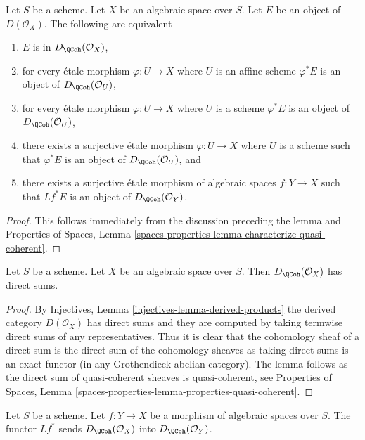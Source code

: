 \begin{lemma}
\label{lemma-check-quasi-coherence-on-covering}
Let $S$ be a scheme. Let $X$ be an algebraic space over $S$.
Let $E$ be an object of $D(\mathcal{O}_X)$. The following are equivalent
\begin{enumerate}
\item $E$ is in $D_\QCoh(\mathcal{O}_X)$,
\item for every \'etale morphism $\varphi : U \to X$ where $U$ is an
affine scheme $\varphi^*E$ is an object of
$D_\QCoh(\mathcal{O}_U)$,
\item for every \'etale morphism $\varphi : U \to X$ where $U$ is a scheme
$\varphi^*E$ is an object of
$D_\QCoh(\mathcal{O}_U)$,
\item there exists a surjective \'etale morphism $\varphi : U \to X$
where $U$ is a scheme such that $\varphi^*E$ is an object of
$D_\QCoh(\mathcal{O}_U)$, and
\item there exists a surjective \'etale morphism of algebraic spaces
$f : Y \to X$ such that $Lf^*E$ is an object of
$D_\QCoh(\mathcal{O}_Y)$.
\end{enumerate}
\end{lemma}

\begin{proof}
This follows immediately from the discussion preceding the lemma and
Properties of Spaces, Lemma
\ref{spaces-properties-lemma-characterize-quasi-coherent}.
\end{proof}

\begin{lemma}
\label{lemma-quasi-coherence-direct-sums}
Let $S$ be a scheme. Let $X$ be an algebraic space over $S$.
Then $D_\QCoh(\mathcal{O}_X)$ has direct sums.
\end{lemma}

\begin{proof}
By Injectives, Lemma \ref{injectives-lemma-derived-products}
the derived category $D(\mathcal{O}_X)$ has direct sums and
they are computed by taking termwise direct sums of any representatives.
Thus it is clear that the cohomology sheaf of a direct sum is the
direct sum of the cohomology sheaves as taking direct sums is
an exact functor (in any Grothendieck abelian category). The lemma
follows as the direct sum of quasi-coherent sheaves is quasi-coherent, see
Properties of Spaces, Lemma
\ref{spaces-properties-lemma-properties-quasi-coherent}.
\end{proof}

\begin{lemma}
\label{lemma-quasi-coherence-pullback}
Let $S$ be a scheme.
Let $f : Y \to X$ be a morphism of algebraic spaces over $S$.
The functor $Lf^*$ sends $D_\QCoh(\mathcal{O}_X)$
into $D_\QCoh(\mathcal{O}_Y)$.
\end{lemma}

